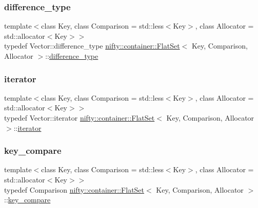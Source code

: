 \subsubsection{\texorpdfstring{difference\+\_\+type}{difference\_type}}
{\footnotesize\ttfamily template$<$class Key, class Comparison = std\+::less$<$\+Key$>$, class Allocator = std\+::allocator$<$\+Key$>$$>$ \\
typedef Vector\+::difference\+\_\+type \hyperlink{classnifty_1_1container_1_1FlatSet}{nifty\+::container\+::\+Flat\+Set}$<$ Key, Comparison, Allocator $>$\+::\hyperlink{classnifty_1_1container_1_1FlatSet_a84e65d3e380dc5d376c9176780333700}{difference\+\_\+type}}

\mbox{\label{classnifty_1_1container_1_1FlatSet_a9c7fd20cd6b1878ccb8a7e068072c795}} 
\subsubsection{\texorpdfstring{iterator}{iterator}}
{\footnotesize\ttfamily template$<$class Key, class Comparison = std\+::less$<$\+Key$>$, class Allocator = std\+::allocator$<$\+Key$>$$>$ \\
typedef Vector\+::iterator \hyperlink{classnifty_1_1container_1_1FlatSet}{nifty\+::container\+::\+Flat\+Set}$<$ Key, Comparison, Allocator $>$\+::\hyperlink{classnifty_1_1container_1_1FlatSet_a9c7fd20cd6b1878ccb8a7e068072c795}{iterator}}

\mbox{\label{classnifty_1_1container_1_1FlatSet_ab88802e81d77a08a7a74e8ba9d2083c7}} 
\subsubsection{\texorpdfstring{key\+\_\+compare}{key\_compare}}
{\footnotesize\ttfamily template$<$class Key, class Comparison = std\+::less$<$\+Key$>$, class Allocator = std\+::allocator$<$\+Key$>$$>$ \\
typedef Comparison \hyperlink{classnifty_1_1container_1_1FlatSet}{nifty\+::container\+::\+Flat\+Set}$<$ Key, Comparison, Allocator $>$\+::\hyperlink{classnifty_1_1container_1_1FlatSet_ab88802e81d77a08a7a74e8ba9d2083c7}{key\+\_\+compare}}


